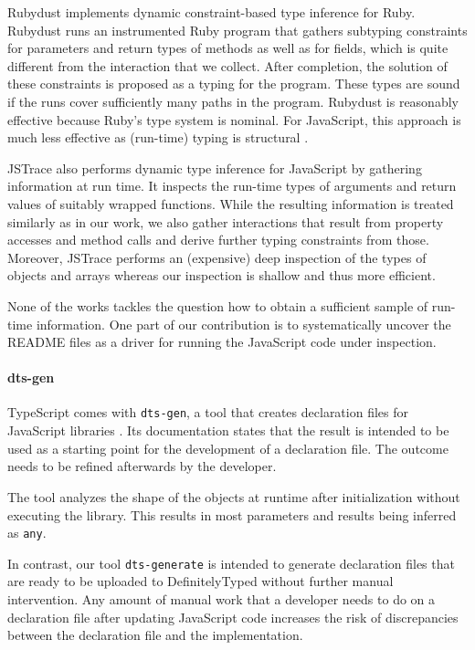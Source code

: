 \documentclass[sigconf]{acmart}
\begin{document}
Rubydust \cite{DBLP:conf/popl/AnCFH11} implements dynamic
constraint-based type inference for Ruby. Rubydust runs an
instrumented Ruby program that gathers subtyping constraints for
parameters and return types of methods as well as for fields, which is
quite different from the interaction that we collect. After
completion, the solution of these constraints is proposed as a typing
for the program. These types are sound if the runs cover sufficiently
many paths in the program. Rubydust is reasonably effective because
Ruby's type system is nominal. For JavaScript, this approach is much
less effective as (run-time) typing is structural
\cite{DBLP:conf/sfp/NausT16}.

JSTrace \cite{saftoiu21:_jstrac} also performs dynamic type inference
for JavaScript by gathering information at run time. It inspects the
run-time types of arguments and return values of suitably wrapped
functions. While the resulting information is treated similarly as in
our work, we also gather interactions that result from property
accesses and method calls and derive further typing constraints from
those. Moreover, JSTrace performs an (expensive) deep inspection of
the types of objects and arrays whereas our inspection is shallow and
thus more efficient.

None of the works tackles the question how to obtain a sufficient
sample of run-time information. One part of our contribution is to
systematically uncover the README files as a driver for running the
JavaScript code under inspection.

\paragraph*{dts-gen}
TypeScript comes with \texttt{dts-gen}, a tool that creates declaration files for
JavaScript libraries \cite{dts-gen}. Its documentation states that the result is 
intended to be used as a starting point for the development of a declaration file. The outcome
needs to be refined afterwards by the developer. 

The tool analyzes the shape of the objects at runtime after initialization without
executing the library. This results in most parameters and results being inferred as
\lstinline[language={}]{any}.

In contrast, our tool \texttt{dts-generate} is intended to generate declaration files
that are ready to be uploaded to DefinitelyTyped without further manual intervention. Any
amount of manual work that a developer needs to do on a declaration file after updating
JavaScript code increases the risk of discrepancies between the declaration file
and the implementation.
\end{document}

